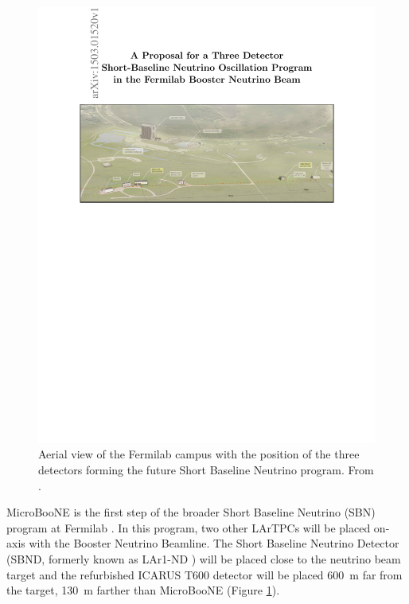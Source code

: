 \begin{figure}[htbp]
    \centering
    \includegraphics[width=0.9\linewidth]{figures/sbn_aerial.pdf}
    \caption{Aerial view of the Fermilab campus with the position of the three detectors forming the future Short Baseline Neutrino program. From \cite{Antonello:2015lea}.}
    \label{fig:sbn_aerial}
\end{figure}

MicroBooNE is the first step of the broader Short Baseline Neutrino (SBN) program at Fermilab \cite{Antonello:2015lea}. In this program, two other LArTPCs will be placed on-axis with the Booster Neutrino Beamline. The Short Baseline Neutrino Detector (SBND, formerly known as LAr1-ND \cite{Adams:2013uaa}) will be placed close to the neutrino beam target and the refurbished ICARUS T600 detector \cite{Varanini:2017pvw} will be placed 600~m far from the target, 130~m farther than MicroBooNE (Figure \ref{fig:sbn_aerial}).


